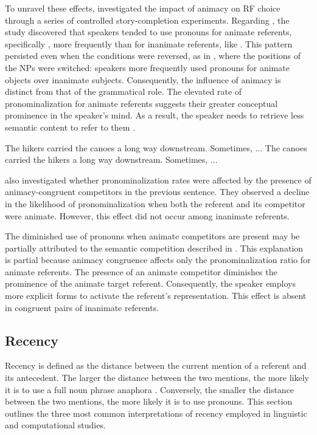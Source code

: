 To unravel these effects, \citet{fukumura2011effect} investigated the impact of animacy on RF choice through a series of controlled story-completion experiments. 
Regarding , the study discovered that speakers tended to use pronouns for animate referents, specifically , more frequently than for inanimate referents, like .
This pattern persisted even when the conditions were reversed, as in , where the positions of the NPs were switched: speakers more frequently used pronouns for animate objects over inanimate subjects.
Consequently, the influence of animacy is distinct from that of the grammatical role.
The elevated rate of pronominalization for animate referents suggests their greater conceptual prominence in the speaker's mind. 
As a result, the speaker needs to retrieve less semantic content to refer to them \citep{fukumura2011effect,vogels2014referential}.

\begin{exe}
	\ex 
	\begin{xlist}
		\ex The hikers carried the canoes a long way downstream. Sometimes, ... \label{ex:hiker1}
		\ex The canoes carried the hikers a long way downstream. Sometimes, ... \label{ex:hiker2}
	\end{xlist}
\end{exe}

\citeauthor{fukumura2011effect} also investigated whether pronominalization rates were affected by the presence of animacy-congruent competitors in the previous sentence. 
They observed a decline in the likelihood of pronominalization when both the referent and its competitor were animate. However, this effect did not occur among inanimate referents.

The diminished use of pronouns when animate competitors are present may be partially attributed to the semantic competition described in .
This explanation is partial because animacy congruence affects only the pronominalization ratio for animate referents. The presence of an animate competitor diminishes the prominence of the animate target referent. Consequently, the speaker employs more explicit forms to activate the referent’s representation. This effect is absent in congruent pairs of inanimate referents.


\subsection{Recency}\label{subsec:recency}
Recency is defined as the distance between the current mention of a referent and its antecedent. The larger the distance between the two mentions, the more likely it is to use a full noun phrase anaphora \citep{vonk1992use,givon1992grammar,Arnold2010}. Conversely, the smaller the distance between the two mentions, the more likely it is to use pronouns. This section outlines the three most common interpretations of recency employed in linguistic and computational studies.

